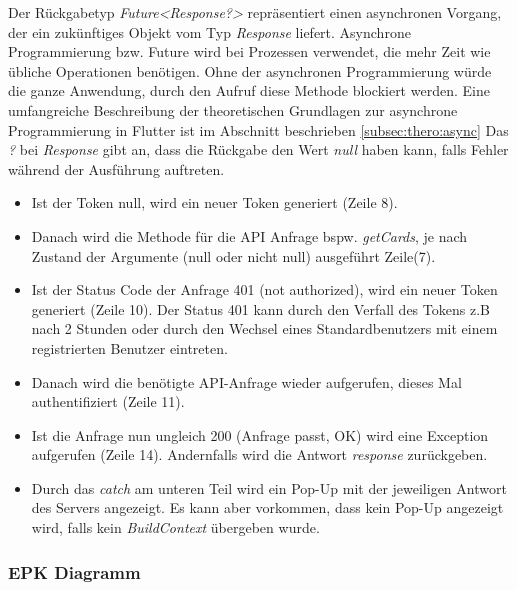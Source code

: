 Der Rückgabetyp {\textit{Future<Response?>}} repräsentiert einen asynchronen Vorgang, der ein zukünftiges Objekt vom Typ {\textit{Response}} liefert. Asynchrone Programmierung bzw. Future wird bei Prozessen verwendet, die mehr Zeit wie übliche Operationen benötigen. Ohne der asynchronen Programmierung würde die ganze Anwendung, durch den Aufruf diese Methode blockiert werden. Eine umfangreiche Beschreibung der theoretischen Grundlagen zur asynchrone Programmierung in Flutter ist im Abschnitt beschrieben \ref{subsec:thero:async} 
Das {\textit{?}} bei {\textit{Response}} gibt an, dass die Rückgabe den Wert {\textit{null}} haben kann, falls Fehler während der Ausführung auftreten.
\begin{itemize}
    \item Ist der Token null, wird ein neuer Token generiert (Zeile 8).
    \item Danach wird die Methode für die API Anfrage bspw. {\textit{getCards}}, je nach Zustand der Argumente (null oder nicht null) ausgeführt Zeile(7).
    \item Ist der Status Code der Anfrage 401 (not authorized), wird ein neuer Token generiert (Zeile 10). Der Status 401 kann durch den Verfall des Tokens z.B nach 2 Stunden oder durch den Wechsel eines Standardbenutzers mit einem registrierten Benutzer eintreten.
    \item Danach wird die benötigte API-Anfrage wieder aufgerufen, dieses Mal authentifiziert (Zeile 11). 
    \item Ist die Anfrage nun ungleich 200 (Anfrage passt, OK) wird eine Exception aufgerufen (Zeile 14). Andernfalls wird die Antwort {\textit{response}} zurückgeben.
    \item Durch das {\textit{catch}} am unteren Teil wird ein Pop-Up mit der jeweiligen Antwort des Servers angezeigt. Es kann aber vorkommen, dass kein Pop-Up angezeigt wird, falls kein {\textit{BuildContext}} übergeben wurde.
\end{itemize}

\newpage

\subsubsection{EPK Diagramm}

